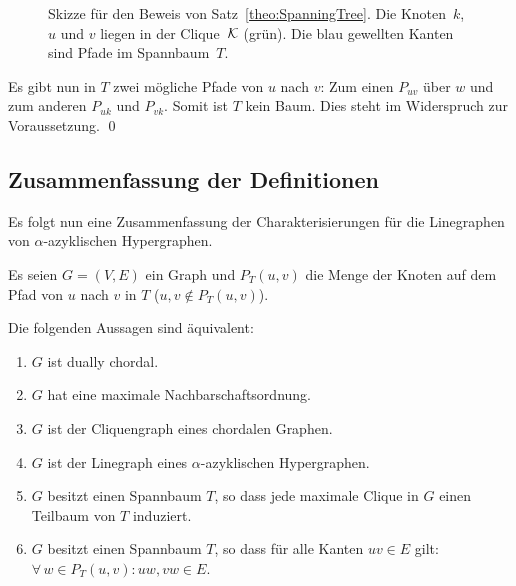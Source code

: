 \begin{Proof}
\begin{figure}[htbp]
        \caption[Skizze für den Beweis von Satz~\ref{theo:SpanningTree}]{Skizze für den Beweis von Satz~\ref{theo:SpanningTree}. Die Knoten~$k$, $u$ und $v$ liegen in der Clique~$\mathcal{K}$ (grün). Die blau gewellten Kanten sind Pfade im Spannbaum~$T$.}
        \label{pic:ProofSpanningTree}
    \end{figure}

    Es gibt nun in $T$ zwei mögliche Pfade von $u$ nach $v$: Zum einen $P_{uv}$ über $w$ und zum anderen $P_{uk}$ und $P_{vk}$. Somit ist $T$ kein Baum. Dies steht im Widerspruch zur Voraussetzung.
    \qed
\end{Proof}

\subsection{Zusammenfassung der Definitionen}

Es folgt nun eine Zusammenfassung der Charakterisierungen für die Linegraphen von $\alpha$-azyklischen Hypergraphen.

\begin{Theorem}\label{theo:duallyChordalChar}
    Es seien $G=(V,E)$ ein Graph und $P_T(u,v)$ die Menge der Knoten auf dem Pfad von $u$ nach $v$ in $T$ ($u,v \notin P_T(u,v)$).

    Die folgenden Aussagen sind äquivalent:
    \begin{enumerate}
        \item \label{case:G_dually} $G$ ist dually chordal.
        \item \label{case:G_maxNeigh} $G$ hat eine maximale Nachbarschaftsordnung.
        \item \label{case:G_chordalClique} $G$ ist der Cliquengraph eines chordalen Graphen.
        \item \label{case:G_alphaLine} $G$ ist der Linegraph eines $\alpha$-azyklischen Hypergraphen.
        \item \label{case:G_SpanningClique} $G$ besitzt einen Spannbaum $T$, so dass jede maximale Clique in $G$ einen Teilbaum von $T$ induziert.
        \item \label{case:G_SpanningPath} $G$ besitzt einen Spannbaum $T$, so dass für alle Kanten $uv \in E$ gilt: $\forall\, w \in P_T(u,v):uw, vw \in E$.
    \end{enumerate}
    
\end{Theorem}


